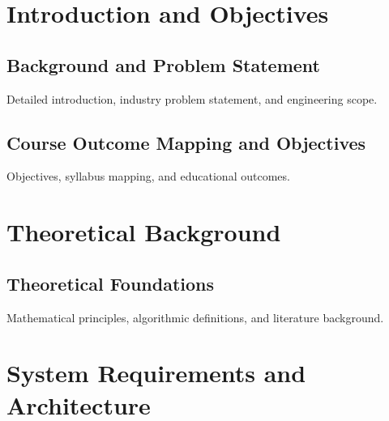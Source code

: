 \documentclass[12pt,a4paper]{report}
\begin{document}
\newpage

\pagestyle{fancy}

\chapter{Introduction and Objectives}

\section{Background and Problem Statement}
Detailed introduction, industry problem statement, and engineering scope.

\section{Course Outcome Mapping and Objectives}
Objectives, syllabus mapping, and educational outcomes.

\newpage

\chapter{Theoretical Background}

\section{Theoretical Foundations}
Mathematical principles, algorithmic definitions, and literature background.

\newpage

\chapter{System Requirements and Architecture}
\end{document}
